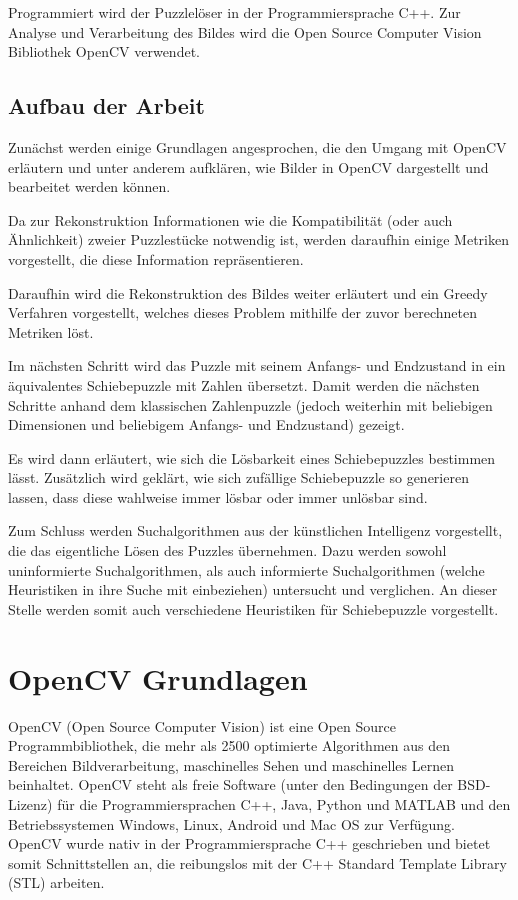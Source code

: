\documentclass{whswinvcbook}
\begin{document}
Programmiert wird der Puzzlelöser in der Programmiersprache C++. Zur Analyse und Verarbeitung des Bildes wird die Open Source Computer Vision Bibliothek OpenCV verwendet.
\section{Aufbau der Arbeit}
Zunächst werden einige Grundlagen angesprochen, die den Umgang mit OpenCV erläutern und unter anderem aufklären, wie Bilder in OpenCV dargestellt und bearbeitet werden können.

Da zur Rekonstruktion Informationen wie die Kompatibilität (oder auch Ähnlichkeit) zweier Puzzlestücke notwendig ist, werden daraufhin einige Metriken vorgestellt, die diese Information repräsentieren.

Daraufhin wird die Rekonstruktion des Bildes weiter erläutert und ein Greedy Verfahren vorgestellt, welches dieses Problem mithilfe der zuvor berechneten Metriken löst.

Im nächsten Schritt wird das Puzzle mit seinem Anfangs- und Endzustand in ein äquivalentes Schiebepuzzle mit Zahlen übersetzt. Damit werden die nächsten Schritte anhand dem klassischen Zahlenpuzzle (jedoch weiterhin mit beliebigen Dimensionen und beliebigem Anfangs- und Endzustand) gezeigt.

Es wird dann erläutert, wie sich die Lösbarkeit eines Schiebepuzzles bestimmen lässt. Zusätzlich wird geklärt, wie sich zufällige Schiebepuzzle so generieren lassen, dass diese wahlweise immer lösbar oder immer unlösbar sind.

Zum Schluss werden Suchalgorithmen aus der künstlichen Intelligenz vorgestellt, die das eigentliche Lösen des Puzzles übernehmen. Dazu werden sowohl uninformierte Suchalgorithmen, als auch informierte Suchalgorithmen (welche Heuristiken in ihre Suche mit einbeziehen) untersucht und verglichen. An dieser Stelle werden somit auch verschiedene Heuristiken für Schiebepuzzle vorgestellt.
\chapter{OpenCV Grundlagen}
OpenCV (Open Source Computer Vision) ist eine Open Source Programmbibliothek, die mehr als 2500 optimierte Algorithmen aus den Bereichen Bildverarbeitung, maschinelles Sehen und maschinelles Lernen beinhaltet.\cite{opencv} OpenCV steht als freie Software (unter den Bedingungen der BSD-Lizenz) für die Programmiersprachen C++, Java, Python und MATLAB und den Betriebssystemen Windows, Linux, Android und Mac OS zur Verfügung. OpenCV wurde nativ in der Programmiersprache C++ geschrieben und bietet somit Schnittstellen an, die reibungslos mit der C++ Standard Template Library (STL) arbeiten.
\end{document}

